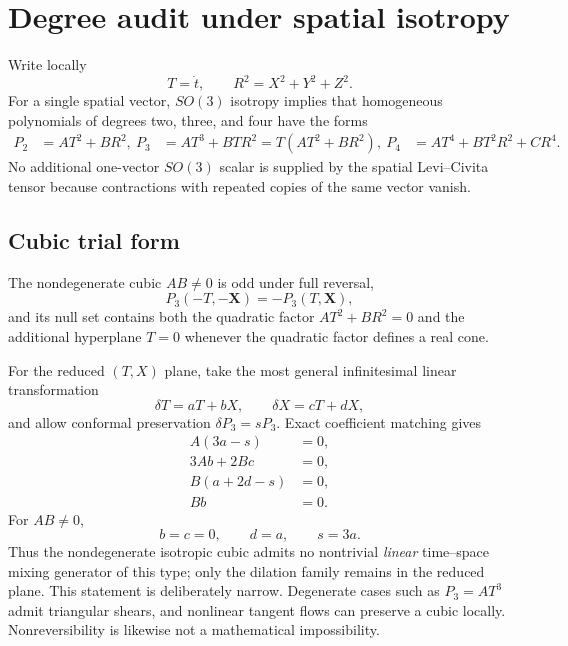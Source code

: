 \documentclass[11pt,a4paper]{article}
\begin{document}
\section{Degree audit under spatial isotropy}
Write locally
\begin{equation}
T=\dot t,\qquad R^2=X^2+Y^2+Z^2.
\end{equation}
For a single spatial vector, $SO(3)$ isotropy implies that homogeneous polynomials of degrees two, three, and four have the forms
\begin{align}
P_2&=AT^2+BR^2,\
P_3&=AT^3+BTR^2=T(AT^2+BR^2),\
P_4&=AT^4+BT^2R^2+CR^4.
\end{align}
No additional one-vector $SO(3)$ scalar is supplied by the spatial Levi--Civita tensor because contractions with repeated copies of the same vector vanish.

\subsection{Cubic trial form}
The nondegenerate cubic $AB\neq0$ is odd under full reversal,
\begin{equation}
P_3(-T,-\bm X)=-P_3(T,\bm X),
\end{equation}
and its null set contains both the quadratic factor $AT^2+BR^2=0$ and the additional hyperplane $T=0$ whenever the quadratic factor defines a real cone.

For the reduced $(T,X)$ plane, take the most general infinitesimal linear transformation
\begin{equation}
\delta T=aT+bX,\qquad \delta X=cT+dX,
\end{equation}
and allow conformal preservation $\delta P_3=sP_3$.  Exact coefficient matching gives
\begin{align}
A(3a-s)&=0,\nonumber\\
3Ab+2Bc&=0,\nonumber\\
B(a+2d-s)&=0,\nonumber\\
Bb&=0.
\end{align}
For $AB\neq0$,
\begin{equation}
\boxed{b=c=0,\qquad d=a,\qquad s=3a}.
\end{equation}
Thus the nondegenerate isotropic cubic admits no nontrivial \emph{linear} time--space mixing generator of this type; only the dilation family remains in the reduced plane.  This statement is deliberately narrow.  Degenerate cases such as $P_3=AT^3$ admit triangular shears, and nonlinear tangent flows can preserve a cubic locally.  Nonreversibility is likewise not a mathematical impossibility.
\end{document}
